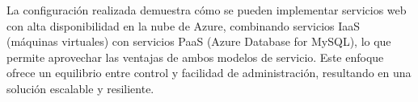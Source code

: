 \documentclass[12pt]{article}
\begin{document}
La configuración realizada demuestra cómo se pueden implementar servicios web con alta disponibilidad en la nube de Azure, combinando servicios IaaS (máquinas virtuales) con servicios PaaS (Azure Database for MySQL), lo que permite aprovechar las ventajas de ambos modelos de servicio. Este enfoque ofrece un equilibrio entre control y facilidad de administración, resultando en una solución escalable y resiliente.
\end{document}
